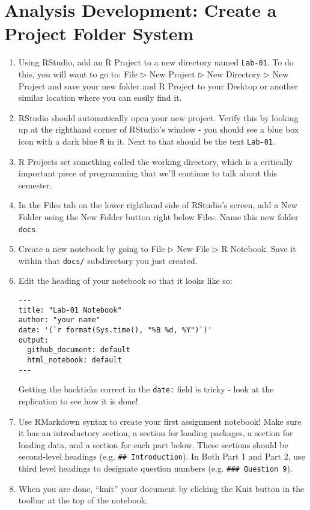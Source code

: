 \documentclass{tufte-handout}
\begin{document}
\section{Analysis Development: Create a Project Folder System}
\begin{enumerate}
\item Using RStudio, add an R Project to a new directory named \texttt{Lab-01}. To do this, you will want to go to: \textsf{File $\triangleright$} {\color{red}\textsf{New Project}} \textsf{$\triangleright$ New Directory $\triangleright$ New Project} and save your new folder and R Project to your Desktop or another similar location where you can easily find it.
\item RStudio should automatically open your new project. Verify this by looking up at the righthand corner of RStudio's window - you should see a blue box icon with a dark blue \texttt{R} in it. Next to that should be the text \texttt{Lab-01}.
\item R Projects set something called the working directory, which is a critically important piece of programming that we'll continue to talk about this semester.
\item In the \textsf{Files} tab on the lower righthand side of RStudio's screen, add a New Folder using the \textsf{New Folder} button right below \textsf{Files}. Name this new folder \texttt{docs}.
\item Create a new notebook by going to \textsf{File $\triangleright$ New File $\triangleright$} {\color{red}\textsf{R Notebook}}. Save it within that \texttt{docs/} subdirectory you just created.
\item Edit the heading of your notebook so that it looks like so: \\
\begin{verbatim}
---
title: "Lab-01 Notebook"
author: "your name"
date: '(`r format(Sys.time(), "%B %d, %Y")`)'
output: 
  github_document: default
  html_notebook: default 
---
\end{verbatim}
Getting the backticks correct in the \texttt{date:} field is tricky - look at the replication to see how it is done!
\item Use RMarkdown syntax to create your first assignment notebook! Make sure it has an introductory section, a section for loading packages, a section for loading data, and a section for each part below. These sections should be second-level headings (e.g. \texttt{\#\# Introduction}). In Both Part 1 and Part 2, use third level headings to designate question numbers (e.g. \texttt{\#\#\# Question 9}).
\item When you are done, ``knit'' your document by clicking the \textsf{Knit} button in the toolbar at the top of the notebook.
\end{enumerate}
\end{document}
